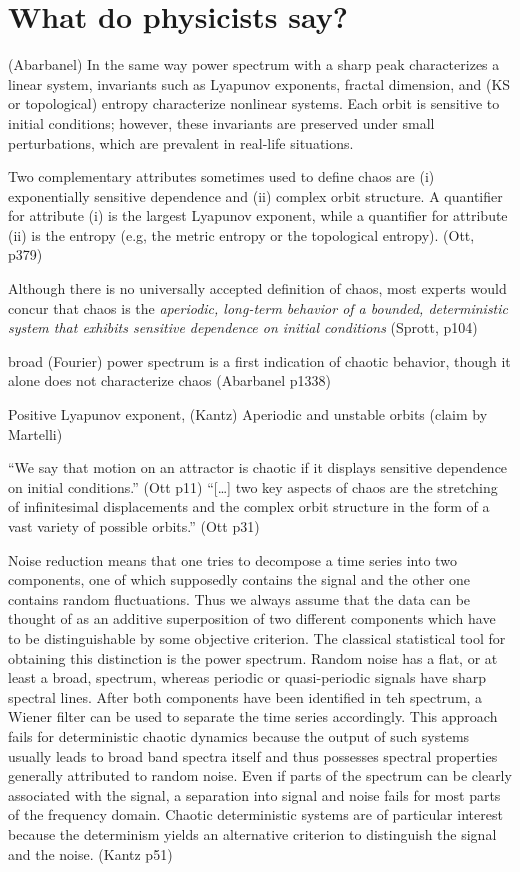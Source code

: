 \documentclass[11pt]{article}
\begin{document}
\section{What do physicists say?}
(Abarbanel)
In the same way power spectrum with a sharp peak characterizes a linear system,
invariants such as Lyapunov exponents, fractal dimension, and (KS or topological) entropy
characterize nonlinear systems.
Each orbit is sensitive to initial conditions; however, these invariants
are preserved under small perturbations, which are prevalent in real-life situations.

Two complementary attributes sometimes used to define chaos are
(i) exponentially sensitive dependence and
(ii) complex orbit structure.
A quantifier for attribute (i) is the largest Lyapunov exponent, while
a quantifier for attribute (ii) is the entropy (e.g, the metric entropy
or the topological entropy).
(Ott, p379)

Although there is no universally accepted definition of chaos,
most experts would concur that chaos is the {\it aperiodic,
  long-term behavior of a bounded, deterministic system
that exhibits sensitive dependence on initial conditions} (Sprott, p104)

broad (Fourier) power spectrum is a first indication of chaotic behavior,
though it alone does not characterize chaos (Abarbanel p1338)

Positive Lyapunov exponent, (Kantz)
Aperiodic and unstable orbits (claim by Martelli)

``We say that motion on an attractor is chaotic if
it displays sensitive dependence on initial conditions.'' (Ott p11)
``[\ldots] two key aspects of chaos are the stretching of infinitesimal displacements
and the complex orbit structure in the form of a vast variety of possible orbits.'' (Ott p31)

Noise reduction means that one tries to decompose a time series into
two components, one of which supposedly contains the signal and the other
one contains random fluctuations. Thus we always assume that the data
can be thought of as an additive superposition of two different components which
have to be distinguishable by some objective criterion. The classical statistical
tool for obtaining this distinction is the power spectrum. Random noise has
a flat, or at least a broad, spectrum, whereas periodic or quasi-periodic
signals have sharp spectral lines. After both components have been identified
in teh spectrum, a Wiener filter can be used to separate the time series
accordingly.
This approach fails for deterministic chaotic dynamics because the output
of such systems usually leads to broad band spectra itself and thus possesses
spectral properties generally attributed to random noise. Even if parts of the
spectrum can be clearly associated with the signal, a separation into signal and
noise fails for most parts of the frequency domain. Chaotic deterministic systems
are of particular interest because the determinism yields an alternative criterion
to distinguish the signal and the noise. (Kantz p51)
\end{document}
